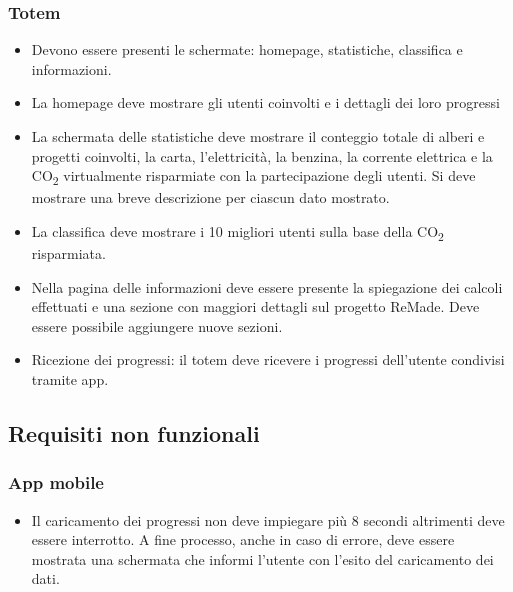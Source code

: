 \subsubsection{Totem}
\begin{itemize}
    \item Devono essere presenti le schermate: homepage, statistiche, classifica e informazioni.
    \item La homepage deve mostrare gli utenti coinvolti e i dettagli dei loro progressi 
    \item La schermata delle statistiche deve mostrare il conteggio totale di alberi e progetti coinvolti, la carta, l'elettricità, la benzina, la corrente elettrica e la CO\textsubscript{2} virtualmente risparmiate con la partecipazione degli utenti. Si deve mostrare una breve descrizione per ciascun dato mostrato.
    \item La classifica deve mostrare i 10 migliori utenti sulla base della CO\textsubscript{2} risparmiata.
    \item Nella pagina delle informazioni deve essere presente la spiegazione dei calcoli effettuati e una sezione con maggiori dettagli sul progetto ReMade. Deve essere possibile aggiungere nuove sezioni.
    \item Ricezione dei progressi: il totem deve ricevere i progressi dell'utente condivisi tramite app.
\end{itemize}
\subsection{Requisiti non funzionali}
\subsubsection{App mobile}
\begin{itemize}
    \item Il caricamento dei progressi non deve impiegare più 8 secondi altrimenti deve essere interrotto. A fine processo, anche in caso di errore, deve essere mostrata una schermata che informi l'utente con l'esito del caricamento dei dati.
\end{itemize}
